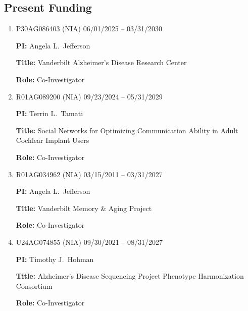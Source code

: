 \documentclass[12pt,letterpaper]{article}
\newenvironment{cventry}{\begin{minipage}[t]{\linewidth}}{\end{minipage}}
\begin{document}
	\subsection*{Present Funding}
	\begin{enumerate}
		\item\begin{cventry} P30AG086403 (NIA) \hfill 06/01/2025 -- 
		03/31/2030
		
		{\bf PI:} Angela L.\ Jefferson
		
		{\bf Title:} Vanderbilt Alzheimer's Disease Research Center
		
		{\bf Role:} Co-Investigator
		\par\end{cventry}
		\item\begin{cventry} R01AG089200 (NIA) \hfill 09/23/2024 -- 
		05/31/2029
		
		{\bf PI:} Terrin L.\ Tamati 
		
		{\bf Title:} Social Networks for Optimizing Communication 
		Ability in Adult Cochlear Implant Users
		
		{\bf Role:} Co-Investigator
		\par\end{cventry}
		\item\begin{cventry} R01AG034962 (NIA) \hfill 03/15/2011 -- 03/31/2027
		
		{\bf PI:} Angela L.\ Jefferson
		
		{\bf Title:} Vanderbilt Memory \& Aging Project
		
		{\bf Role:} Co-Investigator
		\par\end{cventry}
		\item\begin{cventry} U24AG074855 (NIA) \hfill 09/30/2021 -- 08/31/2027
		
		{\bf PI:} Timothy J.\ Hohman
		
		{\bf Title:} Alzheimer's Disease Sequencing Project 
		Phenotype 
		Harmonization Consortium
		
		{\bf Role:} Co-Investigator
		\par\end{cventry}
	\end{enumerate}
	
\end{document}
